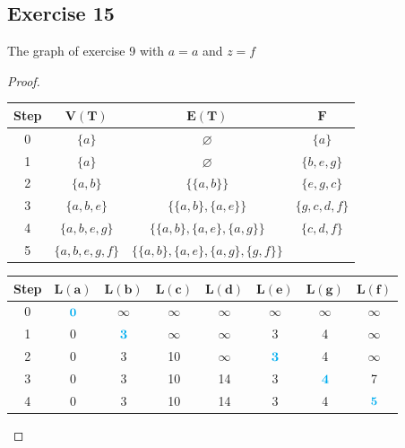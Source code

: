 \documentclass[14pt]{extarticle}
\newcommand{\es}{\varnothing}
\newcommand{\cy}{\color{cyan}}
\begin{document}
\subsection{Exercise 15}
The graph of exercise 9 with \(a = a\) and \(z = f\)
\begin{proof}
    \begin{center}
        \begin{tabular}{|c|c|c|c|}
            \hline
            {\bf \cy Step} & {\cy \(\bm{V(T)}\)} & {\cy \(\bm{E(T)}\)}                        & {\cy \(\bm{F}\)} \\
            \hline
            0              & \(\{a\}\)           & \(\es\)                                    & \(\{a\}\)        \\
            1              & \(\{a\}\)           & \(\es\)                                    & \(\{b,e,g\}\)    \\
            2              & \(\{a,b\}\)         & \(\{\{a,b\}\}\)                            & \(\{e,g,c\}\)    \\
            3              & \(\{a,b,e\}\)       & \(\{\{a,b\}, \{a,e\}\}\)                   & \(\{g,c,d,f\}\)  \\
            4              & \(\{a,b,e,g\}\)     & \(\{\{a,b\}, \{a,e\}, \{a,g\}\}\)          & \(\{c,d,f\}\)    \\
            5              & \(\{a,b,e,g,f\}\)   & \(\{\{a,b\}, \{a,e\}, \{a,g\}, \{g,f\}\}\) &                  \\
            \hline
        \end{tabular}

        \begin{tabular}{|c|c|c|c|c|c|c|c|}
            \hline
            {\bf \cy Step} & {\cy \(\bm{L(a)}\)} & {\cy\(\bm{L(b)}\)} & {\cy\(\bm{L(c)}\)} & {\cy\(\bm{L(d)}\)} & {\cy\(\bm{L(e)}\)} & {\cy\(\bm{L(g)}\)} & {\cy\(\bm{L(f)}\)} \\
            \hline
            0              & \({\cy \bm{0}}\)    & \(\infty\)         & \(\infty\)         & \(\infty\)         & \(\infty\)         & \(\infty\)         & \(\infty\)         \\
            1              & 0                   & \({\cy \bm{3}}\)   & \(\infty\)         & \(\infty\)         & 3                  & 4                  & \(\infty\)         \\
            2              & 0                   & 3                  & 10                 & \(\infty\)         & \({\cy \bm{3}}\)   & 4                  & \(\infty\)         \\
            3              & 0                   & 3                  & 10                 & 14                 & 3                  & \({\cy \bm{4}}\)   & 7                  \\
            4              & 0                   & 3                  & 10                 & 14                 & 3                  & 4                  & \({\cy \bm{5}}\)   \\
            \hline
        \end{tabular}
    \end{center}


\end{proof}
\end{document}
